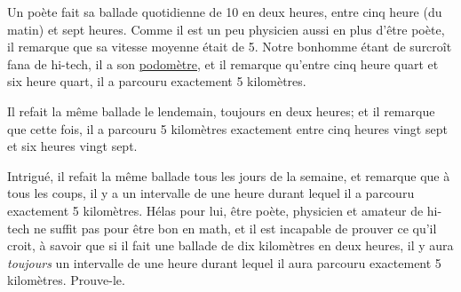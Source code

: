 

\begin{exercice}\label{exo208}
Un poète fait sa ballade quotidienne de \unit{10}{\kilo\meter} en deux heures, entre cinq heure (du matin) et sept heures. Comme il est un peu physicien aussi en plus d'être poète, il remarque que sa vitesse moyenne était de \unit{5}{\kilo\meter\per\hour}. Notre bonhomme étant de surcroît fana de hi-tech, il a son \href{http://fr.wikipedia.org/wiki/Podomètre}{podomètre}, et il remarque qu'entre cinq heure quart et six heure quart, il a parcouru exactement 5 kilomètres.

Il refait la même ballade le lendemain, toujours en deux heures; et il remarque que cette fois, il a parcouru 5 kilomètres exactement entre cinq heures vingt sept et six heures vingt sept.

Intrigué, il refait la même ballade tous les jours de la semaine, et remarque que à tous les coups, il y a un intervalle de une heure durant lequel il a parcouru exactement 5 kilomètres. Hélas pour lui, être poète, physicien et amateur de hi-tech ne suffit pas pour être bon en math, et il est incapable de prouver ce qu'il croit, à savoir que si il fait une ballade de dix kilomètres en deux heures, il y aura \emph{toujours} un intervalle de une heure durant lequel il aura parcouru exactement 5 kilomètres. Prouve-le.
\end{exercice}
